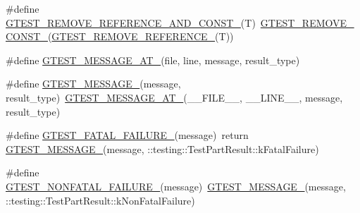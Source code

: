 \begin{DoxyCompactItemize}
\item 
\#define \mbox{\hyperlink{_obj__test_2lib_2googletest-release-1_88_81_2googletest_2include_2gtest_2internal_2gtest-internal_8h_a874567b176266188fabfffb8393267ce}{G\+T\+E\+S\+T\+\_\+\+R\+E\+M\+O\+V\+E\+\_\+\+R\+E\+F\+E\+R\+E\+N\+C\+E\+\_\+\+A\+N\+D\+\_\+\+C\+O\+N\+S\+T\+\_\+}}(T)~\mbox{\hyperlink{_obj__test_2lib_2googletest-release-1_88_81_2googletest_2include_2gtest_2internal_2gtest-internal_8h_a2ffec8c60510eb130af387f5ce9a756a}{G\+T\+E\+S\+T\+\_\+\+R\+E\+M\+O\+V\+E\+\_\+\+C\+O\+N\+S\+T\+\_\+}}(\mbox{\hyperlink{_obj__test_2lib_2googletest-release-1_88_81_2googletest_2include_2gtest_2internal_2gtest-internal_8h_a84c72f25a6a6600e3ff8381ca6982ae9}{G\+T\+E\+S\+T\+\_\+\+R\+E\+M\+O\+V\+E\+\_\+\+R\+E\+F\+E\+R\+E\+N\+C\+E\+\_\+}}(T))
\item 
\#define \mbox{\hyperlink{_obj__test_2lib_2googletest-release-1_88_81_2googletest_2include_2gtest_2internal_2gtest-internal_8h_a8d70025c45a47a493780746dfd66d565}{G\+T\+E\+S\+T\+\_\+\+M\+E\+S\+S\+A\+G\+E\+\_\+\+A\+T\+\_\+}}(file,  line,  message,  result\+\_\+type)
\item 
\#define \mbox{\hyperlink{_obj__test_2lib_2googletest-release-1_88_81_2googletest_2include_2gtest_2internal_2gtest-internal_8h_a94c73d5368ec946bc354d0992ad00810}{G\+T\+E\+S\+T\+\_\+\+M\+E\+S\+S\+A\+G\+E\+\_\+}}(message,  result\+\_\+type)~\mbox{\hyperlink{_obj__test_2lib_2googletest-release-1_88_81_2googletest_2include_2gtest_2internal_2gtest-internal_8h_a8d70025c45a47a493780746dfd66d565}{G\+T\+E\+S\+T\+\_\+\+M\+E\+S\+S\+A\+G\+E\+\_\+\+A\+T\+\_\+}}(\+\_\+\+\_\+\+F\+I\+L\+E\+\_\+\+\_\+, \+\_\+\+\_\+\+L\+I\+N\+E\+\_\+\+\_\+, message, result\+\_\+type)
\item 
\#define \mbox{\hyperlink{_obj__test_2lib_2googletest-release-1_88_81_2googletest_2include_2gtest_2internal_2gtest-internal_8h_a0f9a4c3ea82cc7bf4478eaffdc168358}{G\+T\+E\+S\+T\+\_\+\+F\+A\+T\+A\+L\+\_\+\+F\+A\+I\+L\+U\+R\+E\+\_\+}}(message)~return \mbox{\hyperlink{_obj__test_2lib_2googletest-release-1_88_81_2googletest_2include_2gtest_2internal_2gtest-internal_8h_a94c73d5368ec946bc354d0992ad00810}{G\+T\+E\+S\+T\+\_\+\+M\+E\+S\+S\+A\+G\+E\+\_\+}}(message, \+::testing\+::\+Test\+Part\+Result\+::k\+Fatal\+Failure)
\item 
\#define \mbox{\hyperlink{_obj__test_2lib_2googletest-release-1_88_81_2googletest_2include_2gtest_2internal_2gtest-internal_8h_a6cb7482cfa03661a91c698eb5895f642}{G\+T\+E\+S\+T\+\_\+\+N\+O\+N\+F\+A\+T\+A\+L\+\_\+\+F\+A\+I\+L\+U\+R\+E\+\_\+}}(message)~\mbox{\hyperlink{_obj__test_2lib_2googletest-release-1_88_81_2googletest_2include_2gtest_2internal_2gtest-internal_8h_a94c73d5368ec946bc354d0992ad00810}{G\+T\+E\+S\+T\+\_\+\+M\+E\+S\+S\+A\+G\+E\+\_\+}}(message, \+::testing\+::\+Test\+Part\+Result\+::k\+Non\+Fatal\+Failure)

\end{DoxyCompactItemize}
